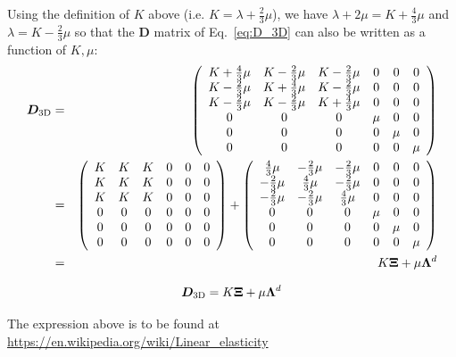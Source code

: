 Using the definition of $K$ above (i.e. $K=\lambda + \frac23 \mu$), 
we have $\lambda +2\mu = K + \frac43 \mu$
and $\lambda= K-\frac23 \mu$ so that the ${\bm D}$ matrix 
of Eq.~\eqref{eq:D_3D} can also be written as a function of $K,\mu$:
\begin{eqnarray}
{\bm D}_{\rm 3D} 
&=& 
\left(
\begin{array}{cccccc}
K+\frac43 \mu & K-\frac23 \mu & K-\frac23 \mu & 0 & 0 & 0 \\ 
K-\frac23 \mu & K+\frac43 \mu & K-\frac23 \mu & 0 & 0 & 0 \\ 
K-\frac23 \mu & K-\frac23 \mu & K+\frac43 \mu & 0 & 0 & 0 \\
0 & 0 & 0 & \mu & 0 & 0 \\ 
0 & 0 & 0 & 0 & \mu & 0 \\ 
0 & 0 & 0 & 0 & 0 & \mu  
\end{array}
\right) \nonumber\\
&=& 
\left(
\begin{array}{cccccc}
K & K & K & 0 & 0 & 0 \\ 
K & K & K & 0 & 0 & 0 \\ 
K & K & K & 0 & 0 & 0 \\
0 & 0 & 0 & 0 & 0 & 0 \\ 
0 & 0 & 0 & 0 & 0 & 0 \\ 
0 & 0 & 0 & 0 & 0 & 0
\end{array}
\right)
+\left(
\begin{array}{cccccc}
 \frac43 \mu & -\frac23 \mu & -\frac23 \mu & 0 & 0 & 0 \\ 
-\frac23 \mu &  \frac43 \mu & -\frac23 \mu & 0 & 0 & 0 \\ 
-\frac23 \mu & -\frac23 \mu &  \frac43 \mu & 0 & 0 & 0 \\
0 & 0 & 0 & \mu & 0 & 0 \\ 
0 & 0 & 0 & 0 & \mu & 0 \\ 
0 & 0 & 0 & 0 & 0 & \mu  
\end{array}
\right)
\nonumber\\
&=& K {\bm \Xi} + \mu {\bm \Lambda}^d
\end{eqnarray}

\begin{mdframed}[backgroundcolor=blue!5]
\[
{\bm D}_{\rm 3D}  =K {\bm \Xi} + \mu {\bm \Lambda}^d
\]
\end{mdframed}

The expression above is to be found at \url{https://en.wikipedia.org/wiki/Linear_elasticity}

